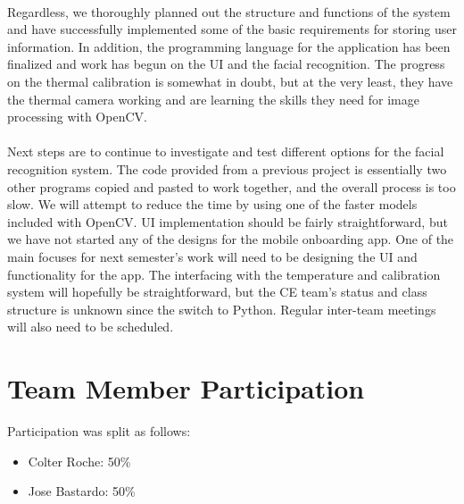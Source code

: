 \documentclass[12pt, letterpaper]{article}
\begin{document}
    \paragraph{}
    Regardless, we thoroughly planned out the structure and functions of the system and have 
    successfully implemented some of the basic requirements for storing user information.  
    In addition, the programming language for the application has been finalized and work has 
    begun on the UI and the facial recognition.  The progress on the thermal calibration is 
    somewhat in doubt, but at the very least, they have the thermal camera working and are 
    learning the skills they need for image processing with OpenCV.
    \paragraph{}
    Next steps are to continue to investigate and test different options for the facial 
    recognition system.  The code provided from a previous project is essentially two other 
    programs copied and pasted to work together, and the overall process is too slow.  We will 
    attempt to reduce the time by using one of the faster models included with OpenCV.  
    UI implementation should be fairly straightforward, but we have not started any of the 
    designs for the mobile onboarding app.  One of the main focuses for next semester’s work 
    will need to be designing the UI and functionality for the app.  The interfacing with the 
    temperature and calibration system will hopefully be straightforward, but the CE team’s 
    status and class structure is unknown since the switch to Python.  Regular inter-team 
    meetings will also need to be scheduled.
    \section{Team Member Participation}
    Participation was split as follows:
    \begin{itemize}
        \item Colter Roche: 50\%
        \item Jose Bastardo: 50\%
    \end{itemize}
\end{document}
